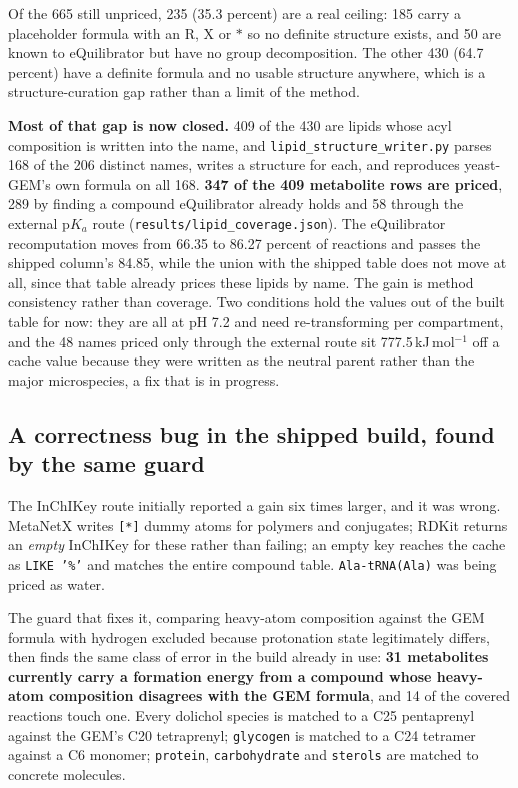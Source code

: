 Of the 665 still unpriced, 235 (35.3 percent) are a real ceiling: 185 carry a placeholder
formula with an R, X or $*$ so no definite structure exists, and 50 are known to
eQuilibrator but have no group decomposition. The other 430 (64.7 percent) have a definite
formula and no usable structure anywhere, which is a structure-curation gap rather than a
limit of the method.

\textbf{Most of that gap is now closed.} 409 of the 430 are lipids whose acyl composition
is written into the name, and \texttt{lipid\_structure\_writer.py} parses 168 of the 206
distinct names, writes a structure for each, and reproduces yeast-GEM's own formula on all
168. \textbf{347 of the 409 metabolite rows are priced}, 289 by finding a compound
eQuilibrator already holds and 58 through the external p$K_a$ route
(\texttt{results/lipid\_coverage.json}). The eQuilibrator recomputation moves from 66.35 to
86.27 percent of reactions and passes the shipped column's 84.85, while the union with the
shipped table does not move at all, since that table already prices these lipids by name.
The gain is method consistency rather than coverage. Two conditions hold the values out of
the built table for now: they are all at pH 7.2 and need re-transforming per compartment,
and the 48 names priced only through the external route sit 777.5\,kJ\,mol$^{-1}$ off a
cache value because they were written as the neutral parent rather than the major
microspecies, a fix that is in progress.

\subsection{A correctness bug in the shipped build, found by the same guard}

The InChIKey route initially reported a gain six times larger, and it was wrong. MetaNetX
writes \texttt{[*]} dummy atoms for polymers and conjugates; RDKit returns an \emph{empty}
InChIKey for these rather than failing; an empty key reaches the cache as \texttt{LIKE
'\%'} and matches the entire compound table. \texttt{Ala-tRNA(Ala)} was being priced as
water.

The guard that fixes it, comparing heavy-atom composition against the GEM formula with
hydrogen excluded because protonation state legitimately differs, then finds the same class
of error in the build already in use: \textbf{31 metabolites currently carry a formation
energy from a compound whose heavy-atom composition disagrees with the GEM formula}, and 14
of the covered reactions touch one. Every dolichol species is matched to a C25
pentaprenyl against the GEM's C20 tetraprenyl; \texttt{glycogen} is matched to a C24
tetramer against a C6 monomer; \texttt{protein}, \texttt{carbohydrate} and \texttt{sterols}
are matched to concrete molecules.

